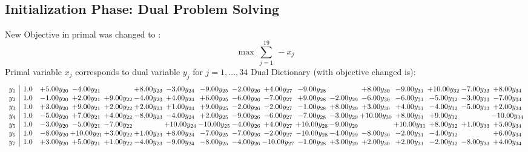 \documentclass[9pt]{article}
\begin{document}
\subsection{Initialization Phase: Dual Problem Solving}
New Objective in primal was changed to : \[ \max\ \sum_{j=1}^{19}\ - x_j \] 
Primal variable $x_j$ corresponds to dual variable $y_j$ for $j = 1,\ldots,34$
Dual Dictionary (with objective changed is): 
\[\begin{array}{c| c c@{\hskip 2pt} c@{\hskip 2pt} c@{\hskip 2pt} c@{\hskip 2pt} c@{\hskip 2pt} c@{\hskip 2pt} c@{\hskip 2pt} c@{\hskip 2pt} c@{\hskip 2pt} c@{\hskip 2pt} c@{\hskip 2pt} c@{\hskip 2pt} c@{\hskip 2pt} c@{\hskip 2pt} c@{\hskip 2pt} }
 y_{1}   &  1.0 & +  5.00 y_{20} & -4.00 y_{21} &   & +  8.00 y_{23} & -3.00 y_{24} & -9.00 y_{25} & -2.00 y_{26} & +  4.00 y_{27} & -9.00 y_{28} &   & +  8.00 y_{30} & -9.00 y_{31} & + 10.00 y_{32} & -7.00 y_{33} & +  8.00 y_{34}\\
 y_{2}   &  1.0 & -1.00 y_{20} & +  2.00 y_{21} & +  9.00 y_{22} & -4.00 y_{23} & +  4.00 y_{24} & +  6.00 y_{25} & -6.00 y_{26} & -7.00 y_{27} & +  9.00 y_{28} & -2.00 y_{29} & -6.00 y_{30} & -6.00 y_{31} & -5.00 y_{32} & -3.00 y_{33} & -7.00 y_{34}\\
 y_{3}   &  1.0 & +  3.00 y_{20} & +  9.00 y_{21} & +  2.00 y_{22} & +  2.00 y_{23} & +  1.00 y_{24} & +  9.00 y_{25} & -2.00 y_{26} & -2.00 y_{27} & -1.00 y_{28} & +  8.00 y_{29} & +  3.00 y_{30} & +  4.00 y_{31} & -4.00 y_{32} & -5.00 y_{33} & +  2.00 y_{34}\\
 y_{4}   &  1.0 & -5.00 y_{20} & +  7.00 y_{21} & +  4.00 y_{22} & -8.00 y_{23} & -4.00 y_{24} & +  2.00 y_{25} & -9.00 y_{26} & -6.00 y_{27} & -7.00 y_{28} & -3.00 y_{29} & + 10.00 y_{30} & +  8.00 y_{31} & +  9.00 y_{32} &   & -10.00 y_{34}\\
 y_{5}   &  1.0 & -3.00 y_{20} & -5.00 y_{21} & -7.00 y_{22} &   & + 10.00 y_{24} & -10.00 y_{25} & -4.00 y_{26} & +  4.00 y_{27} & + 10.00 y_{28} & -9.00 y_{29} &   & + 10.00 y_{31} & +  8.00 y_{32} & +  1.00 y_{33} & +  5.00 y_{34}\\
 y_{6}   &  1.0 & -8.00 y_{20} & + 10.00 y_{21} & +  3.00 y_{22} & +  1.00 y_{23} & +  8.00 y_{24} & -7.00 y_{25} & -7.00 y_{26} & -2.00 y_{27} & -10.00 y_{28} & -4.00 y_{29} & -8.00 y_{30} & -2.00 y_{31} & -4.00 y_{32} &   & +  6.00 y_{34}\\
 y_{7}   &  1.0 & +  3.00 y_{20} & +  5.00 y_{21} & +  1.00 y_{22} & -4.00 y_{23} & -9.00 y_{24} & -8.00 y_{25} & -4.00 y_{26} & -10.00 y_{27} & -1.00 y_{28} & +  3.00 y_{29} & +  2.00 y_{30} & +  2.00 y_{31} & -2.00 y_{32} & -8.00 y_{33} & +  4.00 y_{34}\\

\end{array}\]
\end{document}
